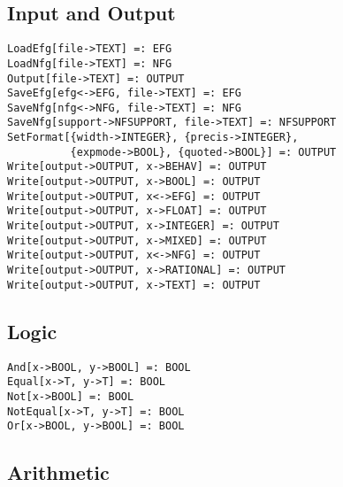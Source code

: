 \subsection{Input and Output}

\begin{verbatim}
LoadEfg[file->TEXT] =: EFG
LoadNfg[file->TEXT] =: NFG
Output[file->TEXT] =: OUTPUT
SaveEfg[efg<->EFG, file->TEXT] =: EFG
SaveNfg[nfg<->NFG, file->TEXT] =: NFG
SaveNfg[support->NFSUPPORT, file->TEXT] =: NFSUPPORT
SetFormat[{width->INTEGER}, {precis->INTEGER}, 
          {expmode->BOOL}, {quoted->BOOL}] =: OUTPUT
Write[output->OUTPUT, x->BEHAV] =: OUTPUT
Write[output->OUTPUT, x->BOOL] =: OUTPUT 
Write[output->OUTPUT, x<->EFG] =: OUTPUT
Write[output->OUTPUT, x->FLOAT] =: OUTPUT
Write[output->OUTPUT, x->INTEGER] =: OUTPUT
Write[output->OUTPUT, x->MIXED] =: OUTPUT
Write[output->OUTPUT, x<->NFG] =: OUTPUT
Write[output->OUTPUT, x->RATIONAL] =: OUTPUT
Write[output->OUTPUT, x->TEXT] =: OUTPUT
\end{verbatim}

\subsection{Logic}

\begin{verbatim}
And[x->BOOL, y->BOOL] =: BOOL
Equal[x->T, y->T] =: BOOL
Not[x->BOOL] =: BOOL
NotEqual[x->T, y->T] =: BOOL
Or[x->BOOL, y->BOOL] =: BOOL
\end{verbatim}

\subsection{Arithmetic}

